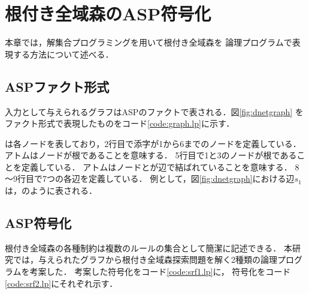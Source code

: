 \chapter{根付き全域森のASP符号化} \label{chap:prop}
本章では，解集合プログラミングを用いて根付き全域森を
論理プログラムで表現する方法について述べる．

\section{ASPファクト形式}
入力として与えられるグラフはASPのファクトで表される．図\ref{fig:dnetgraph}
をファクト形式で表現したものをコード\ref{code:graph.lp}に示す．



は各ノードを表しており，2行目で添字が1から6までのノードを定義している．
アトムはノードが根であることを意味する．
5行目で1と3のノードが根であることを定義している．
アトムはノードとが辺で結ばれていることを意味する．
8～9行目で7つの各辺を定義している．
例として，図\ref{fig:dnetgraph}における辺$s_{1}$は，のように表される．

\section{ASP符号化}
根付き全域森の各種制約は複数のルールの集合として簡潔に記述できる．
本研究では，与えられたグラフから根付き全域森探索問題を解く2種類の論理プログラムを考案した．
考案した符号化をコード\ref{code:srf1.lp}に，
符号化をコード\ref{code:srf2.lp}にそれぞれ示す．





